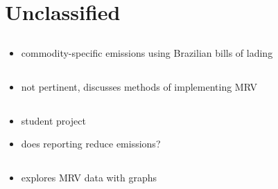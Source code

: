 \documentclass{article}
\newcommand{\paperpath}{../resources/}
\newcommand{\myhref}[2]{\href{run:\paperpath#1}{#2}}
\begin{document}
\section{Unclassified}

\subsection{\myhref{van der Loeff et al 2018 - A spatially explicit data-driven approach to calculating commodity-specific shipping emissions per vessel}{\textcite{van2018spatially}}}
\begin{itemize}
    \item commodity-specific emissions using Brazilian bills of lading
\end{itemize}



\subsection{\myhref{Castells-Sanabra et al 2020 - Existing Emission Calculation Methods Applied to Monitoring, Reporting and Verification (MRV) on Board.pdf}{\textcite{castells2020existing}}}
\begin{itemize}
    \item not pertinent, discusses methods of implementing MRV
\end{itemize}
\subsection{\myhref{lundkvist 2023 - Can targeted disclosure regulations facilitate the environmental transition of the shipping sector    a study on the effect of the EU MRV Regulation on ship emissions.pdf}{\textcite{lundkvist2023can}}}
\begin{itemize}
    \item student project
    \item does reporting reduce emissions?
\end{itemize}
\subsection{\myhref{Luo 2023 - After five years application of the European Union MRV mechanism Review and prospectives.pdf}{\textcite{luo2023after}}}
\begin{itemize}
    \item explores MRV data with graphs
\end{itemize}



\newpage
\printbibliography
\end{document}
